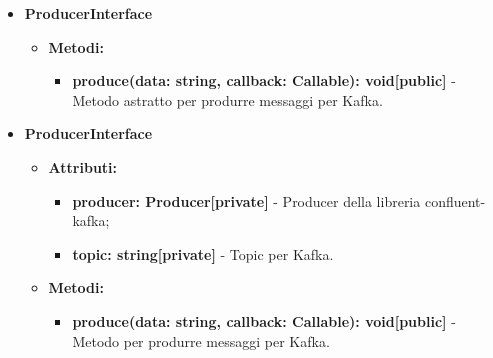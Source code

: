 \documentclass[8pt]{article}
\begin{document}
\begin{itemize}
    \item \textbf{ProducerInterface}
    \begin{itemize}
        \item \textbf{Metodi:}
        \begin{itemize}
            \item \textbf{produce(data: string, callback: Callable): void[public]} - Metodo astratto per produrre messaggi per Kafka.
        \end{itemize}
    \end{itemize}
    \item \textbf{ProducerInterface}
    \begin{itemize}
        \item \textbf{Attributi:}
        \begin{itemize}
            \item \textbf{producer: Producer[private]} - Producer della libreria confluent-kafka;
            \item \textbf{topic: string[private]} - Topic per Kafka.
        \end{itemize}
        \item \textbf{Metodi:}
        \begin{itemize}
            \item \textbf{produce(data: string, callback: Callable): void[public]} - Metodo per produrre messaggi per Kafka.
        \end{itemize}
    \end{itemize}
\end{itemize}
\end{document}
